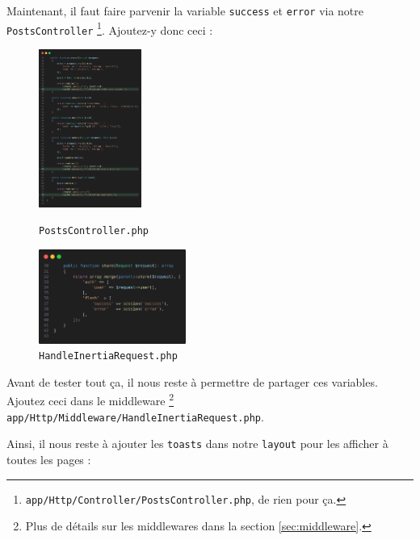 Maintenant, il faut faire parvenir la variable \texttt{success} et \texttt{error} via notre \\ \texttt{PostsController} \footnote{\texttt{app/Http/Controller/PostsController.php}, de rien pour ça.}. Ajoutez-y donc ceci :

\begin{figure}[!h]
    \hspace{1cm}
    \includegraphics[width=0.3\textwidth]{figures-C1/postscontroller_toast.png}
    \label{fig:postscontroller_toast}
    \captionsetup{
    justification=raggedright,
    singlelinecheck=false
    }
    \caption{\texttt{PostsController.php}}
\end{figure}

\newpage

\begin{figure}
    \vspace{-0.5cm}
    \includegraphics[width=0.43\textwidth]{figures-C1/middleware_handleinertia.png}    
    \captionsetup{singlelinecheck=false}   
    \caption{\texttt{HandleInertiaRequest.php}}
    \label{fig:middleware_toast}
\end{figure}

Avant de tester tout ça, il nous reste à permettre \inertia{} de partager ces variables. Ajoutez ceci dans le middleware \footnote{Plus de détails sur les middlewares dans la section \ref{sec:middleware}.} \\ \texttt{app/Http/Middleware/HandleInertiaRequest.php}.

Ainsi, il nous reste à ajouter les \texttt{toasts} dans notre \texttt{layout} pour les afficher à toutes les pages :

